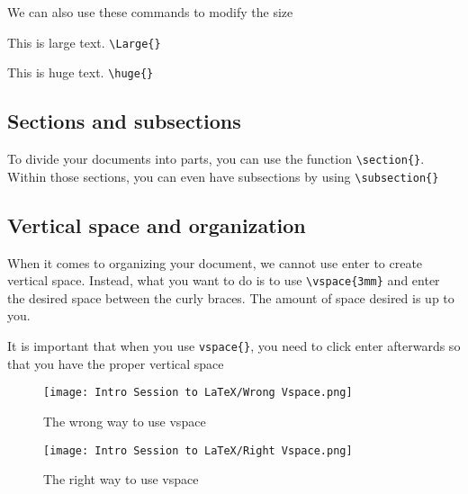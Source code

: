 \documentclass[11pt]{article}
\begin{document}
We can also use these commands to modify the size
\vspace{3mm}

\begin{center}
\Large{This is large text. \verb|\Large{}|}
\vspace{0mm}

\huge{This is huge text. \verb|\huge{}|}
\end{center}

\subsection{Sections and subsections}
To divide your documents into parts, you can use the function \verb|\section{}|. Within those sections, you can even have subsections by using \verb|\subsection{}|
\vspace{3mm}

\subsection{Vertical space and organization}
When it comes to organizing your document, we cannot use enter to create vertical space. Instead, what you want to do is to use \verb|\vspace{3mm}| and enter the desired space between the curly braces. The amount of space desired is up to you.
\vspace{3mm}

It is important that when you use \verb|vspace{}|, you need to click enter afterwards so that you have the proper vertical space

\vspace{3mm}
\begin{figure}[htbp]
\centerline{\texttt{[image: Intro Session to LaTeX/Wrong Vspace.png]}}
\caption{The wrong way to use vspace}
\end{figure}

\vspace{3mm}
\begin{figure}[htbp]
\centerline{\texttt{[image: Intro Session to LaTeX/Right Vspace.png]}}
\caption{The right way to use vspace}
\end{figure}
\vspace{3mm}
\end{document}
